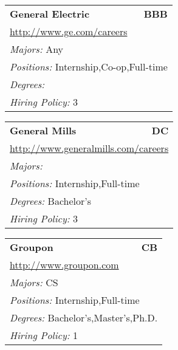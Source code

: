 \documentclass[twoside]{article}
\begin{document}
\begin{center}
\begin{multicols}{3}
\begin{FlushLeft}
\begin{minipage}{\columnwidth}
\end{minipage}
 
\begin{minipage}{\columnwidth}\begin{tabularx}{.95\columnwidth}{Xr}
                 {\Large\bf General Electric} & {\Large\bf BBB}\\
    \multicolumn{2}{p{.95\columnwidth}}{\url{http://www.ge.com/careers}}\\
    \multicolumn{2}{p{.95\columnwidth}}{\emph{Majors:} Any}\\
    \multicolumn{2}{p{.95\columnwidth}}{\emph{Positions:} Internship,Co-op,Full-time}\\
    \multicolumn{2}{p{.95\columnwidth}}{\emph{Degrees:} }\\
    \multicolumn{2}{p{.95\columnwidth}}{\emph{Hiring Policy:} 3}\\
    \end{tabularx}
    
\end{minipage}
 
\begin{minipage}{\columnwidth}\begin{tabularx}{.95\columnwidth}{Xr}
                 {\Large\bf General Mills} & {\Large\bf DC}\\
    \multicolumn{2}{p{.95\columnwidth}}{\url{http://www.generalmills.com/careers}}\\
    \multicolumn{2}{p{.95\columnwidth}}{\emph{Majors:} }\\
    \multicolumn{2}{p{.95\columnwidth}}{\emph{Positions:} Internship,Full-time}\\
    \multicolumn{2}{p{.95\columnwidth}}{\emph{Degrees:} Bachelor's}\\
    \multicolumn{2}{p{.95\columnwidth}}{\emph{Hiring Policy:} 3}\\
    \end{tabularx}
    
\end{minipage}
 
\begin{minipage}{\columnwidth}\begin{tabularx}{.95\columnwidth}{Xr}
                 {\Large\bf Groupon} & {\Large\bf CB}\\
    \multicolumn{2}{p{.95\columnwidth}}{\url{http://www.groupon.com}}\\
    \multicolumn{2}{p{.95\columnwidth}}{\emph{Majors:} CS}\\
    \multicolumn{2}{p{.95\columnwidth}}{\emph{Positions:} Internship,Full-time}\\
    \multicolumn{2}{p{.95\columnwidth}}{\emph{Degrees:} Bachelor's,Master's,Ph.D.}\\
    \multicolumn{2}{p{.95\columnwidth}}{\emph{Hiring Policy:} 1}\\
    \end{tabularx}
    

\end{minipage}
\end{FlushLeft}
\end{multicols}
\end{center}
\end{document}
